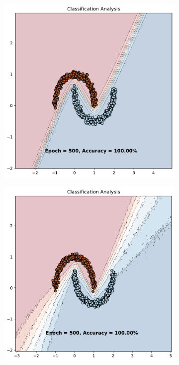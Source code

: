 \begin{figure}[H]
    \centering
    \begin{subfigure}{0.45\textwidth}
        \includegraphics[width=\textwidth]{dropout.pdf}
        \caption{}
    \end{subfigure}%
    \begin{subfigure}{0.45\textwidth}
        \includegraphics[width=\textwidth]{mcdropout.pdf}
        \caption{}
    \end{subfigure}%
    \caption{}
    \label{fig:dropout}
\end{figure}
